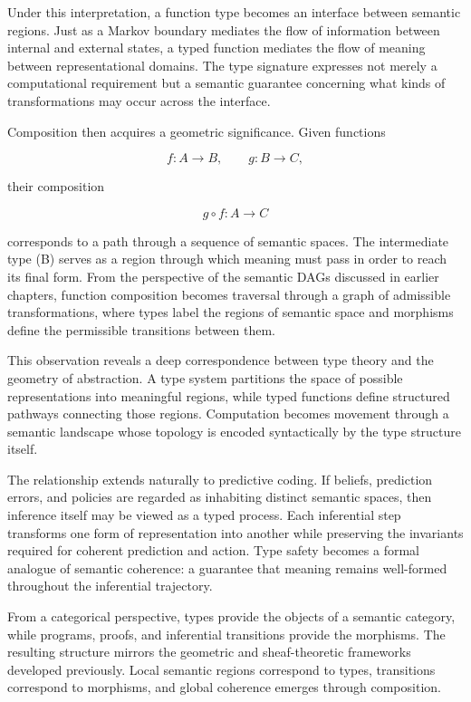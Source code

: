 \documentclass[12pt,letterpaper]{article}
\theoremstyle{remark}
\begin{document}
Under this interpretation, a function type becomes an interface between semantic regions. Just as a Markov boundary mediates the flow of information between internal and external states, a typed function mediates the flow of meaning between representational domains. The type signature expresses not merely a computational requirement but a semantic guarantee concerning what kinds of transformations may occur across the interface.

Composition then acquires a geometric significance. Given functions

\[
f : A \to B,
\qquad
g : B \to C,
\]

their composition

\[
g \circ f : A \to C
\]

corresponds to a path through a sequence of semantic spaces. The intermediate type (B) serves as a region through which meaning must pass in order to reach its final form. From the perspective of the semantic DAGs discussed in earlier chapters, function composition becomes traversal through a graph of admissible transformations, where types label the regions of semantic space and morphisms define the permissible transitions between them.

This observation reveals a deep correspondence between type theory and the geometry of abstraction. A type system partitions the space of possible representations into meaningful regions, while typed functions define structured pathways connecting those regions. Computation becomes movement through a semantic landscape whose topology is encoded syntactically by the type structure itself.

The relationship extends naturally to predictive coding. If beliefs, prediction errors, and policies are regarded as inhabiting distinct semantic spaces, then inference itself may be viewed as a typed process. Each inferential step transforms one form of representation into another while preserving the invariants required for coherent prediction and action. Type safety becomes a formal analogue of semantic coherence: a guarantee that meaning remains well-formed throughout the inferential trajectory.

From a categorical perspective, types provide the objects of a semantic category, while programs, proofs, and inferential transitions provide the morphisms. The resulting structure mirrors the geometric and sheaf-theoretic frameworks developed previously. Local semantic regions correspond to types, transitions correspond to morphisms, and global coherence emerges through composition.
\end{document}
